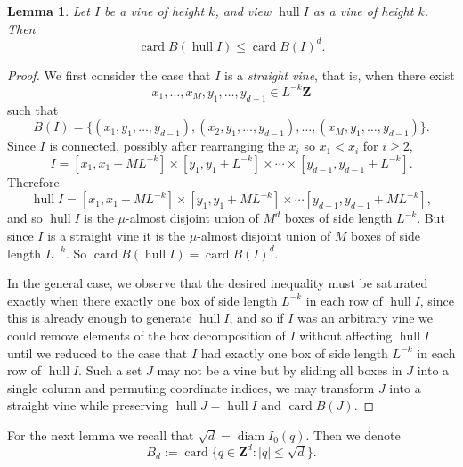 \documentclass[reqno,10pt]{amsart}
\newcommand{\ZZ}{\mathbf{Z}}
\DeclareMathOperator{\card}{card}
\DeclareMathOperator{\diam}{diam}
\DeclareMathOperator{\hull}{hull}
\newcommand{\dfn}[1]{\emph{#1}\index{#1}}
\newtheorem{lemma}[theorem]{Lemma}
\theoremstyle{definition}
\numberwithin{equation}{section}
\begin{document}
\begin{lemma}\label{vine to hull}
Let $I$ be a vine of height $k$, and view $\hull I$ as a vine of height $k$.
Then
$$\card B(\hull I) \leq \card B(I)^d.$$
\end{lemma}
\begin{proof}
We first consider the case that $I$ is a \dfn{straight vine}, that is, when there exist
$$x_1, \dots, x_M, y_1, \dots, y_{d - 1} \in L^{-k}\ZZ$$
such that
$$B(I) = \{(x_1, y_1, \dots, y_{d - 1}), (x_2, y_1, \dots, y_{d - 1}), \dots, (x_M, y_1, \dots, y_{d - 1})\}.$$
Since $I$ is connected, possibly after rearranging the $x_i$ so $x_1 < x_i$ for $i \geq 2$,
$$I = [x_1, x_1 + ML^{-k}] \times [y_1, y_1 + L^{-k}] \times \cdots \times [y_{d - 1}, y_{d - 1} + L^{-k}].$$
Therefore 
$$\hull I = [x_1, x_1 + ML^{-k}] \times [y_1, y_1 + ML^{-k}] \times \cdots [y_{d - 1}, y_{d - 1} + ML^{-k}],$$
and so $\hull I$ is the $\mu$-almost disjoint union of $M^d$ boxes of side length $L^{-k}$.
But since $I$ is a straight vine it is the $\mu$-almost disjoint union of $M$ boxes of side length $L^{-k}$.
So $\card B(\hull I) = \card B(I)^d$.

In the general case, we observe that the desired inequality must be saturated exactly when there exactly one box of side length $L^{-k}$ in each row of $\hull I$, since this is already enough to generate $\hull I$, and so if $I$ was an arbitrary vine we could remove elements of the box decomposition of $I$ without affecting $\hull I$ until we reduced to the case that $I$ had exactly one box of side length $L^{-k}$ in each row of $\hull I$.
Such a set $J$ may not be a vine but by sliding all boxes in $J$ into a single column and permuting coordinate indices, we may transform $J$ into a straight vine while preserving $\hull J = \hull I$ and $\card B(J)$.
\end{proof}

For the next lemma we recall that $\sqrt d = \diam I_0(q)$.
Then we denote 
$$B_d := \card \{q \in \ZZ^d: |q| \leq \sqrt d\}.$$
\end{document}
